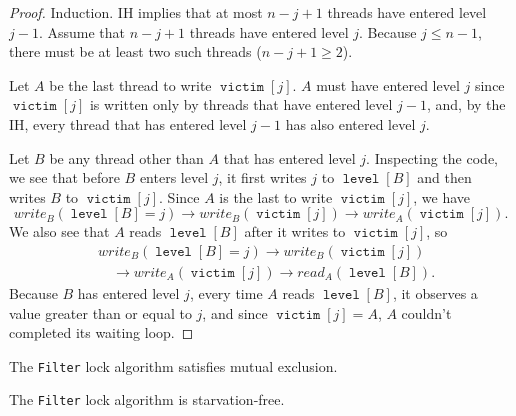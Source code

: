 \documentclass[11pt]{article}
\DeclareMathOperator{\victim}{\texttt{victim}}
\DeclareMathOperator{\tlevel}{\texttt{level}}
\begin{document}
\begin{proof}
Induction. IH implies that at most \(n-j+1\) threads have entered level \(j-1\). Assume that \(n-j+1\)
threads have entered level \(j\). Because \(j\le n-1\), there must be at least two such threads
(\(n-j+1\ge 2\)).

Let \(A\) be the last thread to write \(\victim[j]\). \(A\) must have entered level \(j\) since
\(\victim[j]\) is written only by threads that have entered level \(j-1\), and, by the IH, every
thread that has entered level \(j-1\) has also entered level \(j\).

Let \(B\) be any thread other than \(A\) that has entered level \(j\). Inspecting the code, we see
that before \(B\) enters level \(j\), it first writes \(j\) to \(\tlevel[B]\) and then writes \(B\) to
\(\victim[j]\). Since \(A\) is the last to write \(\victim[j]\), we have
\begin{equation*}
write_B(\tlevel[B]=j)\to write_B(\victim[j])\to write_A(\victim[j]).
\end{equation*}
We also see that \(A\) reads \(\tlevel[B]\) after it writes to \(\victim[j]\), so
\begin{align*}
&write_B(\tlevel[B]=j)\to write_B(\victim[j])\\&\quad\to write_A(\victim[j])\to read_A(\tlevel[B]).
\end{align*}
Because \(B\) has entered level \(j\), every time \(A\) reads \(\tlevel[B]\), it observes a value
greater than or equal to \(j\), and since \(\victim[j]=A\), \(A\) couldn't completed its waiting loop.
\end{proof}

\begin{corollary}[]
The \texttt{Filter} lock algorithm satisfies mutual exclusion.
\end{corollary}

\begin{lemma}[]
The \texttt{Filter} lock algorithm is starvation-free.
\end{lemma}
\end{document}
